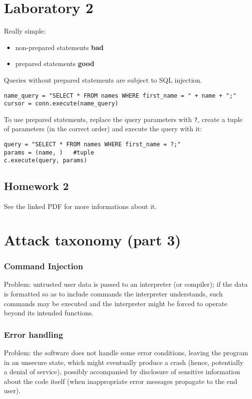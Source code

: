 \documentclass[a4paper, 10pt, titlepage]{article}
\begin{document}
\section{Laboratory 2}
Really simple:
\begin{itemize}
\item non-prepared statements \textbf{bad}
\item prepared statements \textbf{good}
\end{itemize}
Queries without prepared statements are subject to SQL injection.
\begin{lstlisting}
name_query = "SELECT * FROM names WHERE first_name = " + name + ";"
cursor = conn.execute(name_query)
\end{lstlisting}
To use prepared statements, replace the query parameters with \lstinline|?|, create a tuple of parameters (in the correct order) and execute the query with it:
\begin{lstlisting}
query = "SELECT * FROM names WHERE first_name = ?;"
params = (name, )	#tuple
c.execute(query, params)
\end{lstlisting}
\subsection{Homework 2}
See the linked PDF for more informations about it. 
	
\newpage
\section{Attack taxonomy (part 3)}
\subsubsection*{Command Injection}
Problem: untrusted user data is passed to an interpreter (or compiler); if the data is formatted so as to include commands the interpreter understands, such commands may be executed and the interpreter might be forced to operate beyond its intended functions.

\subsubsection*{Error handling}
Problem: the software does not handle some error conditions, leaving the program in an unsecure state, which might eventually produce a crash (hence, potentially a denial of service), possibly accompanied by disclosure of sensitive information about the code itself (when inappropriate error messages propagate to the end user).
\end{document}
